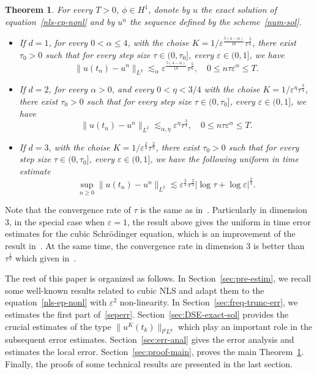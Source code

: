 \documentclass[10pt,a4paper]{article}
\newtheorem{theorem}{Theorem}[section]
\begin{document}
  
  \begin{theorem}\label{main}
    For every \( T > 0 \), \( \phi \in H^1 \), donote by \(u\) the exact solution
    of equation~\eqref{nls-ep-nonl} and by \(u^n\) the sequence defined by the 
    scheme~\eqref{num-sol}.
    \begin{itemize}
      \item If \(d=1\), for every \(0 < \alpha \leq 4\), with the choise 
        \(K=1/\varepsilon^\frac{5(4-\alpha)}{18}\tau^\frac56\), there exist \(\tau_0 > 0\) 
        such that for every step size \(\tau \in (0,\tau_0]\), every 
        \( \varepsilon \in (0,1] \), we have 
        \[ \|u(t_n)-u^n\|_{L^2} \lesssim_\alpha \varepsilon^\frac{5(4-\alpha)}{18}\tau^\frac56, \quad 
        0 \leq n\tau\varepsilon^\alpha \leq T. \]
      \item If \(d=2\), for every \(\alpha > 0\), and every \(0 < \eta < 3/4\) with 
        the choise \(K=1/\varepsilon^\eta\tau^\frac34\), there exist \(\tau_0 > 0\) 
        such that for every step size \(\tau \in (0,\tau_0]\), every 
        \( \varepsilon \in (0,1] \), we have
        \[ \|u(t_n)-u^n\|_{L^2} \lesssim_{\alpha,\eta} \varepsilon^\eta \tau^\frac34, \quad 
        0 \leq n\tau\varepsilon^\alpha \leq T. \]
      \item If \(d=3\), with the choise \(K=1/\varepsilon^\frac23\tau^\frac23\), 
        there exist \(\tau_0 > 0\) 
        such that for every step size \(\tau \in (0,\tau_0]\), every 
        \( \varepsilon \in (0,1] \), 
        we have the following uniform in time estimate
        \[ \sup_{n \geq 0} \|u(t_n)-u^n\|_{L^2} \lesssim \varepsilon^\frac23 
        \tau^\frac23|\log\tau+\log\varepsilon|^\frac23. \]
    \end{itemize}
  \end{theorem}

  Note that the convergence rate of \(\tau\) is the same as in~\cite{ORS21}. 
  Particularly in dimension \(3\), in the special case when \(\varepsilon=1\), the
  result above gives the uniform in time error estimates for the cubic
  Schr\"odinger equation, which is an improvement of the result in~\cite{ORS21}.
  At the same time, the convergence rate in dimension \(3\) is better than 
  \(\tau^\frac12\) which given in~\cite{CS22}.

  The rest of this paper is organized as follows. In
  Section~\ref{sec:pre-estim}, we recall some well-known results related to
  cubic NLS and adapt them to the equation~\eqref{nls-ep-nonl} with
  \(\varepsilon^2\) non-linearity. In Section~\ref{sec:freq-trunc-err}, we estimates 
  the first part of~\eqref{seperr}. Section~\ref{sec:DSE-exact-sol}
  provides the crucial estimates of the type \(\|u^K(t_k)\|_{l^p L^q}\) which play an
  important role in the subsequent error estimates. Section~\ref{sec:err-anal}
  gives the error analysis and estimates the local error. Section~\ref{sec:proof-main},
  proves the main Theorem~\ref{main}. Finally, the proofs of  some technical 
  results are presented in the last section.
\end{document}
